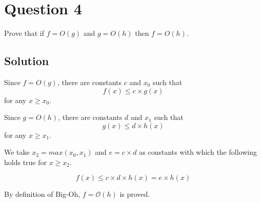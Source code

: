 
\section*{Question 4}
Prove that if $f = O(g)$ and $g = O(h)$ then $f = O(h)$.

\subsection*{Solution}
Since $f = O(g)$, there are constants $c$ and $x_0$ such that
\begin{equation}
f(x) \leq c \times g(x)
\label{eq9}
\end{equation}
for any $x \geq x_0$.

Since $g = O(h)$, there are constants $d$ and $x_1$ such that
\begin{equation}
g(x) \leq d \times h(x)
\end{equation}
for any $x \geq x_1$.

We take $x_2 = max(x_0,x_1)$ and $e = c \times d$ as constants with which the following holds true for $x \geq x_2$.

\begin{equation}
f(x) \leq c \times d \times h(x) = e \times h(x)
\end{equation}

By definition of Big-Oh, $f = \mathcal{O}(h)$ is proved.
